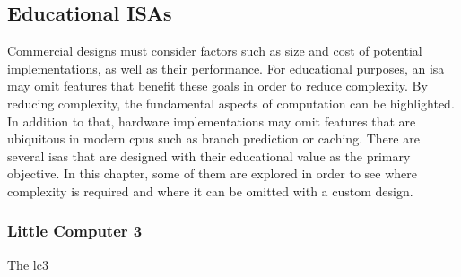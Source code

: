 \subsection{Educational ISAs}

Commercial designs must consider factors such as size and cost of potential implementations, as well as their performance. For educational purposes, an \ac{isa} may omit features that benefit these goals in order to reduce complexity. By reducing complexity, the fundamental aspects of computation can be highlighted. In addition to that, hardware implementations may omit features that are ubiquitous in modern \acp{cpu} such as branch prediction or caching. There are several \acp{isa} that are designed with their educational value as the primary objective. In this chapter, some of them are explored in order to see where complexity is required and where it can be omitted with a custom design.

\subsubsection{Little Computer 3}

The \ac{lc3}
